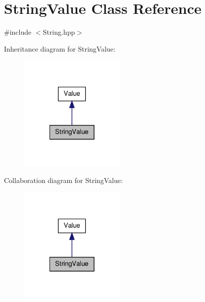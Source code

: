 \hypertarget{class_string_value}{\section{String\-Value Class Reference}
\label{class_string_value}
}


{\ttfamily \#include $<$String.\-hpp$>$}



Inheritance diagram for String\-Value\-:
\nopagebreak
\begin{figure}[H]
\begin{center}
\leavevmode
\includegraphics[width=146pt]{class_string_value__inherit__graph}
\end{center}
\end{figure}


Collaboration diagram for String\-Value\-:
\nopagebreak
\begin{figure}[H]
\begin{center}
\leavevmode
\includegraphics[width=146pt]{class_string_value__coll__graph}
\end{center}
\end{figure}
